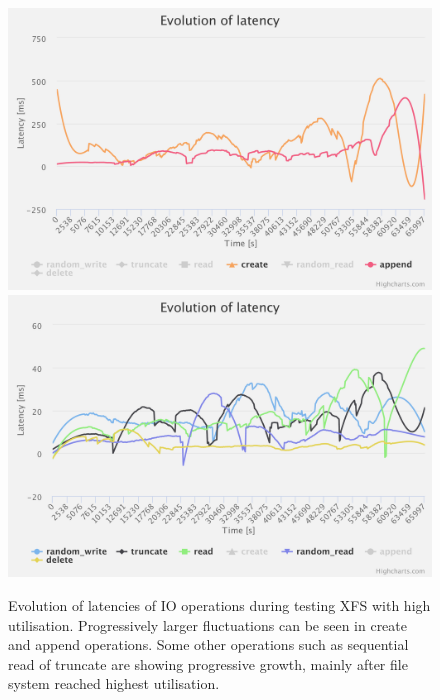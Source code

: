 \documentclass[
  color, %
  table, %
  lof,   %
  lot,   %
]{fithesis3}
\begin{document}
\begin{figure}[!htb]
    \centering
   \begin{minipage}{\textwidth}
        \centering
        \includegraphics[width=\textwidth]{../charts/HDD_xfs/high_ca}
        \includegraphics[width=\textwidth]{../charts/HDD_xfs/high_other}
        \caption[Evolution of latencies of XFS during testing of high utilisation of HDD]{Evolution of latencies of IO operations during testing XFS with high utilisation. Progressively larger fluctuations can be seen in create and append operations. Some other operations such as sequential read of truncate are showing progressive growth, mainly after file system reached highest utilisation.}
\label{fig:lats99_xfs}
    \end{minipage}
\end{figure}


\clearpage
\end{document}
